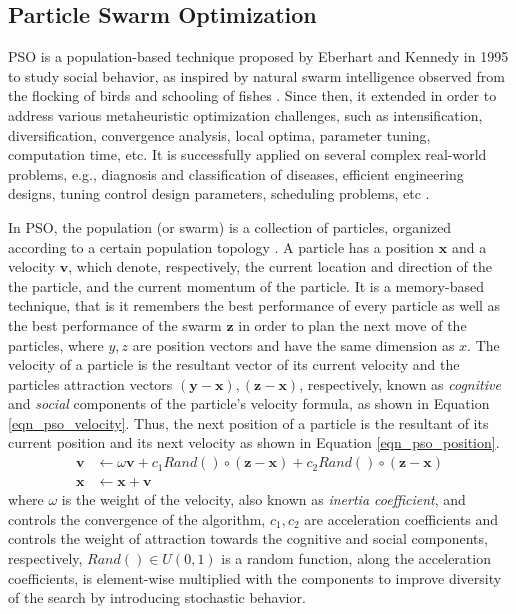 \subsection{Particle Swarm Optimization}
PSO is a population-based technique proposed by Eberhart and Kennedy in 1995 to study social behavior, as inspired by natural swarm intelligence observed from the flocking of birds and schooling of fishes \cite{Kennedy1995ParticleOptimization}. Since then, it extended in order to address various metaheuristic optimization challenges, such as intensification, diversification, convergence analysis, local optima, parameter tuning, computation time, etc. It is successfully applied on several complex real-world problems, e.g., diagnosis and classification of diseases, efficient engineering designs, tuning control design parameters, scheduling problems, etc \cite{Poli2008AnApplications}. 

In PSO, the population (or swarm) is a collection of particles, organized according to a certain population topology \cite{Liu2016TopologyOptimization}. A particle has a position $\textbf{x}$ and a velocity $\textbf{v}$, which denote, respectively, the current location and direction of the the particle, and the current momentum of the particle. It is a memory-based technique, that is it remembers the best performance of every particle as well as the best performance of the swarm $\textbf{z}$ in order to plan the next move of the particles, where $y,z$ are position vectors and have the same dimension as $x$. The velocity of a particle is the resultant vector of its current velocity and the particles attraction vectors $(\textbf{y}-\textbf{x}), (\textbf{z}-\textbf{x})$, respectively, known as \textit{cognitive} and \textit{social} components of the  particle's velocity formula, as shown in Equation \ref{eqn_pso_velocity}. Thus, the next position of a particle is the resultant of its current position and its next velocity as shown in Equation \ref{eqn_pso_position}.
\begin{align}
    \label{eqn_pso_velocity}
    \textbf{v} &\leftarrow  \omega\textbf{v} + c_1Rand()\circ(\textbf{z}-\textbf{x}) + c_2Rand()\circ(\textbf{z}-\textbf{x})\\
    \label{eqn_pso_position}
    \textbf{x} &\leftarrow \textbf{x} + \textbf{v}
\end{align}
where $\omega$ is the weight of the velocity, also known as \textit{inertia coefficient}, and controls the convergence of the algorithm, $c_1, c_2$ are acceleration coefficients and controls the weight of attraction towards the cognitive and social components, respectively, $Rand()\in U(0,1)$ is a random function, along the acceleration coefficients, is element-wise multiplied with the components to improve diversity of the search by introducing stochastic behavior.

